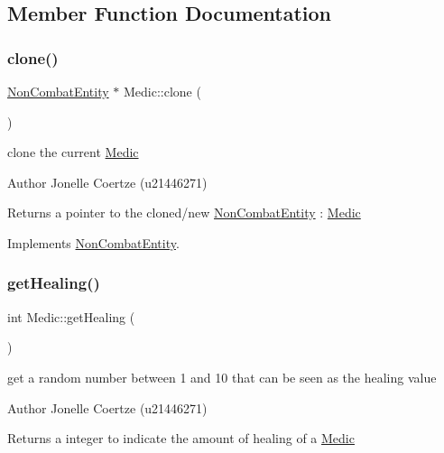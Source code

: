 \subsection{Member Function Documentation}
\mbox{\label{class_medic_a973bcb165d5cb3d3b4f522496234f690}} 
\subsubsection{\texorpdfstring{clone()}{clone()}}
{\footnotesize\ttfamily \mbox{\hyperlink{class_non_combat_entity}{Non\+Combat\+Entity}} $\ast$ Medic\+::clone (\begin{DoxyParamCaption}{ }\end{DoxyParamCaption})\hspace{0.3cm}{\ttfamily [virtual]}}



clone the current \mbox{\hyperlink{class_medic}{Medic}} 

\begin{DoxyAuthor}{Author}
Jonelle Coertze (u21446271) 
\end{DoxyAuthor}
\begin{DoxyReturn}{Returns}
a pointer to the cloned/new \mbox{\hyperlink{class_non_combat_entity}{Non\+Combat\+Entity}} \+: \mbox{\hyperlink{class_medic}{Medic}} 
\end{DoxyReturn}


Implements \mbox{\hyperlink{class_non_combat_entity_a4d6e9ad6c7682a10e2e491cac30fd0c0}{Non\+Combat\+Entity}}.

\mbox{\label{class_medic_a9fb060ee25f974cc27d0786ca6c43ddf}} 
\subsubsection{\texorpdfstring{getHealing()}{getHealing()}}
{\footnotesize\ttfamily int Medic\+::get\+Healing (\begin{DoxyParamCaption}{ }\end{DoxyParamCaption})}



get a random number between 1 and 10 that can be seen as the healing value 

\begin{DoxyAuthor}{Author}
Jonelle Coertze (u21446271) 
\end{DoxyAuthor}
\begin{DoxyReturn}{Returns}
a integer to indicate the amount of healing of a \mbox{\hyperlink{class_medic}{Medic}} 
\end{DoxyReturn}
